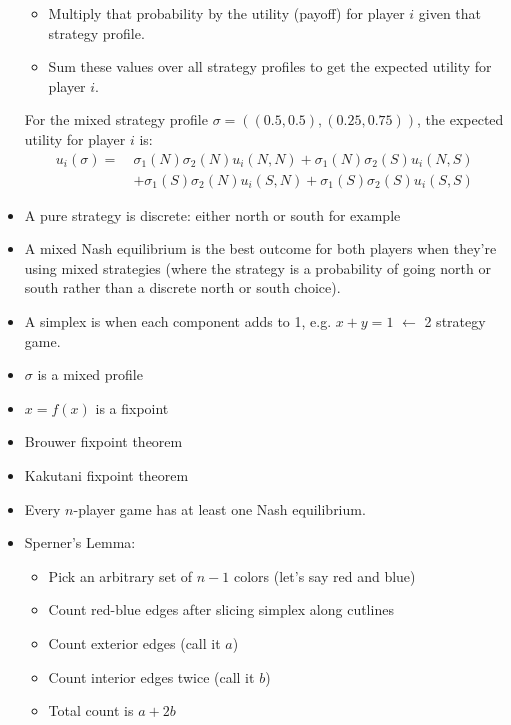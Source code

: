 \documentclass{article}
\begin{document}
\begin{itemize}
\begin{itemize}
      \item Multiply that probability by the utility (payoff) for player $i$ given that strategy profile.
      \item Sum these values over all strategy profiles to get the expected utility for player $i$.
    \end{itemize}
  For the mixed strategy profile $\sigma = ((0.5, 0.5), (0.25, 0.75))$, the expected utility for player $i$ is:
  \begin{align*}
      u_i(\sigma) =\ &\sigma_1(N)\sigma_2(N)u_i(N, N) + \sigma_1(N)\sigma_2(S)u_i(N, S) \\
  &+ \sigma_1(S)\sigma_2(N)u_i(S, N) + \sigma_1(S)\sigma_2(S)u_i(S, S)
  \end{align*}
  
  \item A pure strategy is discrete: either north or south for example
  \item A mixed Nash equilibrium is the best outcome for both players when they're using mixed strategies (where the strategy is a probability of going north or south rather than a discrete north or south choice).
  \item A simplex is when each component adds to 1, e.g. $x+y=1$ $\leftarrow$ 2 strategy game.
  \item $\sigma$ is a mixed profile
  \item $x=f(x)$ is a fixpoint
  \item Brouwer fixpoint theorem
  \item Kakutani fixpoint theorem
  \item Every $n$-player game has at least one Nash equilibrium.
  \item Sperner's Lemma:
    \begin{itemize}
      \item Pick an arbitrary set of $n-1$ colors (let’s say red and blue)
      \item Count red-blue edges after slicing simplex along cutlines
      \item Count exterior edges (call it $a$)
      \item Count interior edges twice (call it $b$)
      \item Total count is $a + 2b$
    \end{itemize}
\end{itemize}
\end{document}
